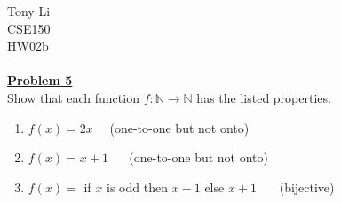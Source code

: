 \documentclass[11pt]{article}
\begin{document}
\noindent 
Tony Li \\
CSE150 \\
HW02b \\\\

\noindent\textbf{\underline{Problem 5}}\\
	Show that each function $f : \mathbb{N} \rightarrow \mathbb{N}$ has the listed properties.
	
	\begin{enumerate}
		\item $f(x) = 2x$ \,\,\,\,\,\,(one-to-one but not onto)
		\item $f(x) = x+1$ \,\,\,\,\,\, (one-to-one but not onto)
		\item $f(x) =$ if $x$ is odd then $x-1$ else $x+1$ \,\,\,\,\,\,\, (bijective)

	\end{enumerate}
\end{document}
